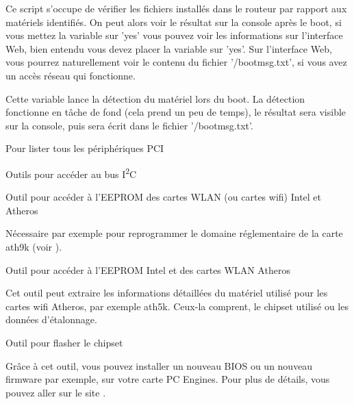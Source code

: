 \begin{description}


    Ce script s'occupe de vérifier les fichiers installés dans le routeur
    par rapport aux matériels identifiés. On peut alors voir le résultat sur
    la console après le boot, si vous mettez la variable 
    sur 'yes' vous pouvez voir les informations sur l'interface Web, bien entendu
    vous devez placer la variable  sur 'yes'.
    Sur l'interface Web, vous pourrez naturellement voir le contenu du fichier
    '/bootmsg.txt', si vous avez un accès réseau qui fonctionne.


    Cette variable lance la détection du matériel lors du boot. La détection
    fonctionne en tâche de fond (cela prend un peu de temps), le résultat sera
    visible sur la console, puis sera écrit dans le fichier '/bootmsg.txt'.

 Pour lister tous les périphériques PCI

 Outils pour accéder
au bus I\textsuperscript{2}C

 Outil pour accéder à
l'EEPROM des cartes WLAN (ou cartes wifi) Intel et Atheros

	Nécessaire par exemple pour reprogrammer le domaine réglementaire de la carte ath9k
	(voir ).

 Outil pour accéder à
l'EEPROM Intel et des cartes WLAN Atheros

	Cet outil peut extraire les informations détaillées du matériel utilisé pour les cartes
	wifi Atheros, par exemple ath5k. Ceux-la comprent, le chipset utilisé ou les données
	d'étalonnage.

 Outil pour flasher le chipset

	Grâce à cet outil, vous pouvez installer un nouveau BIOS ou un nouveau firmware
	par exemple, sur votre carte PC Engines. Pour plus de détails, vous pouvez aller
	sur le site .

\end{description}

